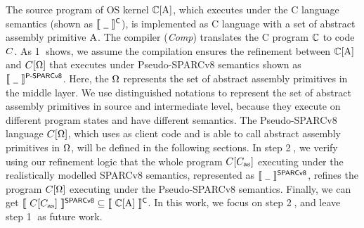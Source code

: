 

The source program of OS kernel
$\mathbb{C}[\text{A}]$, which executes
under the C language semantics (shown as
$\llbracket \ {\underline{\ \,}} \ \rrbracket^{\textsf{C}}$),
is implemented as C language
with a set of abstract assembly primitive $\text{A}$.
The compiler (\textit{Comp}) translates the
C program $\mathbb{C}$ to \sparc{} code $C$.
As {\color{blue} \textcircled{1}} shows,
we assume the compilation ensures the
refinement between $\mathbb{C}[\text{A}]$ and
$C[\Omega]$ that
executes under Pseudo-SPARCv8 semantics shown as
$\llbracket \ {\underline{\ \,}} \ \rrbracket^{\textsf{P-SPARCv8}}$.
Here, the $\Omega$ represents the set of
abstract assembly primitives in the middle layer.
We use distinguished notations to represent
the set of abstract assembly primitives in source
and intermediate level, because they execute on
different program states and have different semantics.
The Pseudo-SPARCv8 language $C[\Omega]$,
which uses \sparc{} as client code and is able to
call abstract assembly primitives in $\Omega$,
will be defined in the following sections.
In step {\color{blue} \textcircled{2}},
we verify using our refinement logic that
the whole \sparc{} program
$C[C_{\text{as}}]$ executing under the realistically
modelled SPARCv8 semantics, represented as
$\llbracket \ {\underline{\ \,}} \ \rrbracket^{\textsf{SPARCv8}}$, refines
the program $C[\Omega]$ executing
under the Pseudo-SPARCv8 semantics.
Finally, we can get
$\llbracket \ {C[C_{\text{as}}]} \ \rrbracket^{\textsf{SPARCv8}}
\subseteq
\llbracket \ {\mathbb{C}[\text{A}]} \ \rrbracket^{\textsf{C}}$.
In this work, we focus on
step {\color{blue} \textcircled{2}}, and
leave step {\color{blue} \textcircled{1}}
as future work.

